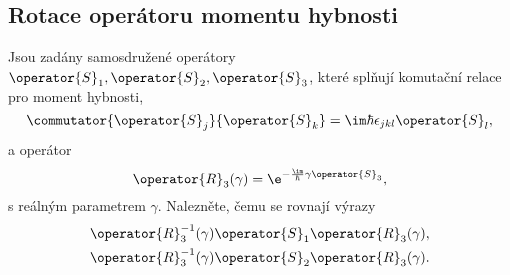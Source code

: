 \subsection{Rotace operátoru momentu hybnosti}\label{sec:RotationOperator}
Jsou zadány samosdružené operátory $\operator{S}_{1},\operator{S}_{2},\operator{S}_{3}$, které splňují komutační relace pro moment hybnosti,
\begin{equation}\label{eq:CommutatorS}
    \commutator{\operator{S}_{j}}{\operator{S}_{k}}
        =\im\hbar\epsilon_{jkl}\operator{S}_{l},
\end{equation}
a operátor
\begin{equation}
    \operator{R}_{3}(\gamma)
        =\e^{-\frac{\im}{\hbar}\gamma\operator{S}_{3}},
\end{equation}
s reálným parametrem $\gamma$.	
Nalezněte, čemu se rovnají výrazy
\begin{subequations}
    \begin{align}
        \operator{R}_{3}^{-1}(\gamma)\operator{S}_{1}\operator{R}_{3}(\gamma),\\
        \operator{R}_{3}^{-1}(\gamma)\operator{S}_{2}\operator{R}_{3}(\gamma).
    \end{align}
\end{subequations}

